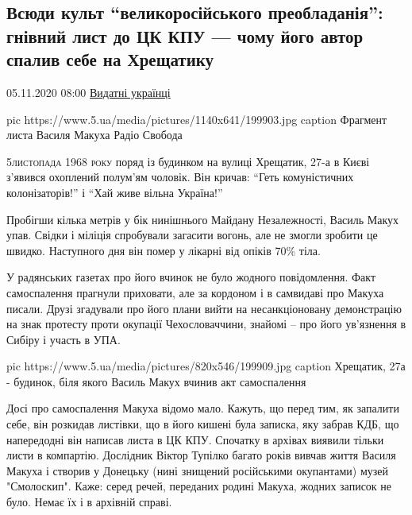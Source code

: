  
 
 

\subsection{Всюди культ \enquote{великоросійського преобладанія}: гнівний лист до ЦК КПУ --- чому його автор спалив себе на Хрещатику}
\label{sec:05_11_2020.news.ua.5ua.1.vasyl_makuh_kiev_1968_samospalennja}

05.11.2020 08:00 \href{https://www.5.ua/spetstemy/154/}{Видатні українці}


\ifcmt
pic https://www.5.ua/media/pictures/1140x641/199903.jpg
caption Фрагмент листа Василя Макуха Радіо Свобода
\fi

\lettrine[lines=3]{5}{листопада 1968 року} поряд із будинком на вулиці Хрещатик, 27-а в Києві
з'явився охоплений полум'ям чоловік. Він кричав: \enquote{Геть комуністичних
колонізаторів!} і \enquote{Хай живе вільна Україна!}

Пробігши кілька метрів у бік нинішнього Майдану Незалежності, Василь Макух
упав. Свідки і міліція спробували загасити вогонь, але не змогли зробити це
швидко. Наступного дня він помер у лікарні від опіків 70\% тіла.

У радянських газетах про його вчинок не було жодного повідомлення. Факт
самоспалення прагнули приховати, але за кордоном і в самвидаві про
Макуха писали. Друзі згадували про його плани вийти на несанкціоновану
демонстрацію на знак протесту проти окупації Чехословаччини, знайомі –
про його ув'язнення в Сибіру і участь в УПА.

\ifcmt
pic https://www.5.ua/media/pictures/820x546/199909.jpg
caption Хрещатик, 27а - будинок, біля якого Василь Макух вчинив акт самоспалення 
\fi

Досі про самоспалення Макуха відомо мало. Кажуть, що перед тим, як запалити
себе, він розкидав листівки, що в його кишені була записка, яку забрав КДБ, що
напередодні він написав листа в ЦК КПУ. Спочатку в архівах виявили тільки листи
в компартію. Дослідник Віктор Тупілко багато років вивчав життя Василя Макуха і
створив у Донецьку (нині знищений російськими окупантами) музей "Смолоскип".
Каже: серед речей, переданих родині Макуха, жодних записок не було. Немає їх і
в архівній справі.

